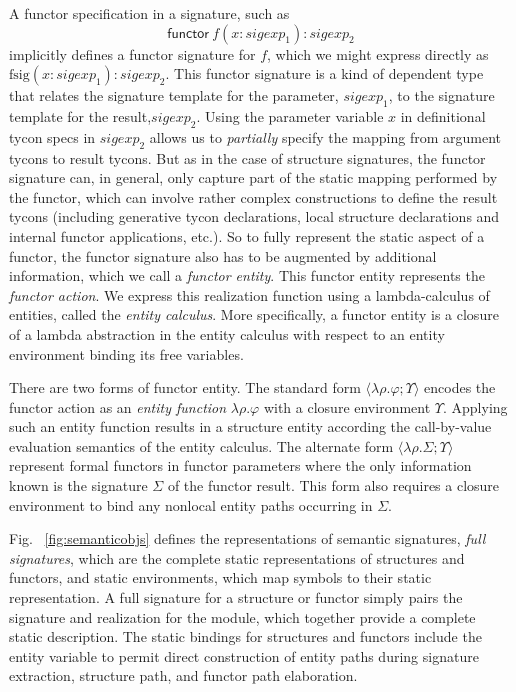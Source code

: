 \documentclass[9pt,nocopyrightspace, fleqn]{sigplanconf}
\begin{document}
A functor specification in a signature, such as
\[
\mathsf{functor}~ f(x: \mathit{sigexp}_1) : \mathit{sigexp}_2
\]
implicitly defines a functor signature for $f$, which we might express
directly as $\mathrm{fsig}(x: \mathit{sigexp}_1) : \mathit{sigexp}_2$.
This functor signature is a kind of dependent type that relates the
signature template for the parameter, $\mathit{sigexp}_1$, to the
signature template for the result,$\mathit{sigexp}_2$.  Using the
parameter variable $x$ in definitional tycon specs in
$\mathit{sigexp}_2$ allows us to \emph{partially} specify the mapping
from argument tycons to result tycons.  But as in the case of
structure signatures, the functor signature can, in general, only
capture part of the static mapping performed by the functor, which can
involve rather complex constructions to define the result tycons
(including generative tycon declarations, local structure declarations
and internal functor applications, etc.).  So to fully represent the
static aspect of a functor, the functor signature also has to be
augmented by additional information, which we call a \emph{functor
  entity}.  This functor entity represents the \emph{functor
  action}.  We express this realization function using a
lambda-calculus of entities, called the \emph{entity calculus}.  More
specifically, a functor entity is a closure of a lambda abstraction in
the entity calculus with respect to an entity environment binding its
free variables.

There are two forms of functor entity. The standard form
$\langle\lambda\rho.\varphi;\Upsilon\rangle$ encodes the functor
action as an \emph{entity function} $\lambda\rho.\varphi$
with a closure environment $\Upsilon$. Applying such an entity
function results in a structure entity according the call-by-value
evaluation semantics of the entity calculus. The alternate form
$\langle\lambda\rho.\Sigma;\Upsilon\rangle$ represent formal functors in
functor parameters where the only information known is the
signature $\Sigma$ of the functor result. This form also requires
a closure environment to bind any nonlocal entity paths occurring in
$\Sigma$.


Fig. ~\ref{fig:semanticobjs} defines the representations of semantic
signatures, \emph{full signatures}, which are the complete static
representations of structures and functors, and static environments,
which map symbols to their static representation.  A full signature
for a structure or functor simply pairs the signature and realization
for the module, which together provide a complete static description.
The static bindings for structures and functors include the entity
variable to permit direct construction of entity paths during
signature extraction, structure path, and functor path elaboration.  
\end{document}

